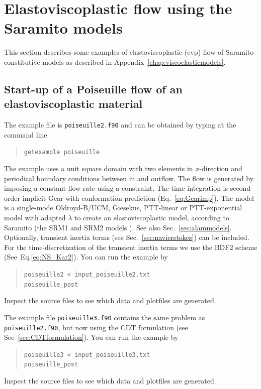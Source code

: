 
\def\headdate{23rd June 2024}

\section{Elastoviscoplastic flow using the Saramito models}
\label{sec:evp_flow}

This section describes some examples of elastoviscoplastic (evp) flow of 
Saramito constitutive models as described in
Appendix~\ref{chap:viscoelasticmodels}.
 
 \subsection{Start-up of a Poiseuille flow of an elastoviscoplastic material}
 
The example file is \texttt{poiseuille2.f90} and can
be obtained by typing at the
command line:
\begin{quote}
   \texttt{getexample poiseuille}
\end{quote}
The example uses a unit square domain with two elements in $x$-direction and
periodical boundary conditions between in and outflow.
The flow is generated by imposing a constant flow rate using a constraint.
The time integration is second-order implicit Gear with conformation prediction
(Eq.~\eqref{eq:Gearimp}).
The model is a single-mode Oldroyd-B/UCM, Giesekus, PTT-linear or
PTT-exponential model with adapted $\lambda$ to create an elastoviscoplastic model, according to Saramito (the SRM1 and SRM2 models \cite{saramito_new_2007,saramito_new_2009}). See also Sec.~\ref{sec:alammodels}.
Optionally, transient inertia terms (see Sec.~\ref{sec:navierstokes})
can be included. For the time-discretization of the transient inertia terms we
use the BDF2 scheme (See~Eq.\eqref{eq:NS_Kar2}).
You can run the example by
\begin{quote}
   \texttt{poiseuille2 < input\_poiseuille2.txt}\\
   \texttt{poiseuille\_post}
\end{quote}
Inspect the source files to see which data and plotfiles are generated.

The example file \texttt{poiseuille3.f90} contains the same problem as \texttt{poiseuille2.f90}, but now using the CDT formulation (see Sec~\ref{sec:CDTformulation}). You can run the example by
\begin{quote}
   \texttt{poiseuille3 < input\_poiseuille3.txt}\\
   \texttt{poiseuille\_post}
\end{quote}
Inspect the source files to see which data and plotfiles are generated.

